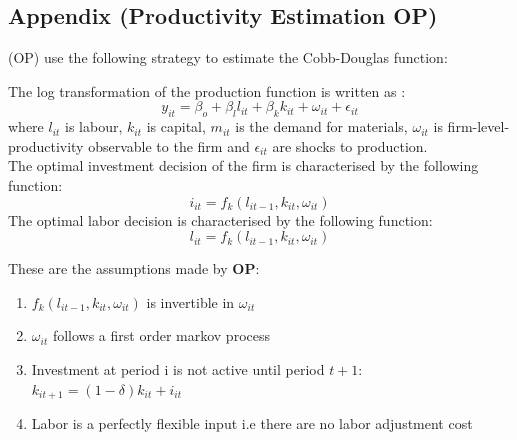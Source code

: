 \documentclass[12pt]{article}
\begin{document}
\subsection{Appendix (Productivity Estimation OP)}\label{prodest}
\label{op}

 \textcite{olley1992dynamics} (OP) use the
following strategy to estimate the Cobb-Douglas function: 


The log transformation of the production function is written as : 
\begin{equation}
y_{it} = \beta_{o} + \beta_{l}l_{it} + \beta_{k}k_{it} + \omega_{it} + \epsilon_{it} 
\end{equation}
where $l_{it}$ is labour, $k_{it}$ is capital, $m_{it}$  is
the demand for materials, $\omega_{it}$ is firm-level-productivity
observable to the firm and $\epsilon_{it}$ are shocks to production.\\
The optimal investment decision of the firm is characterised by the following
function:
\begin{equation}
i_{it}= f_{k}(l_{it-1}, k_{it}, \omega_{it})
\end{equation}
The optimal labor decision is characterised by the following function:
\begin{equation}
l_{it}= f_{k}(l_{it-1}, k_{it}, \omega_{it})
\end{equation}

These are the assumptions made by \textbf{OP}:
\begin{enumerate}
\item $f_{k}(l_{it-1}, k_{it}, \omega_{it})$ is invertible in
  $\omega_{it}$
\item $\omega_{it}$ follows a first order markov process 
\item Investment at period i is not active until period $t+1$:
  $k_{it+1}= (1-\delta)k_{it} + i_{it}$
\item Labor is a perfectly flexible input i.e there are no labor
  adjustment cost
\end{enumerate}
\end{document}
